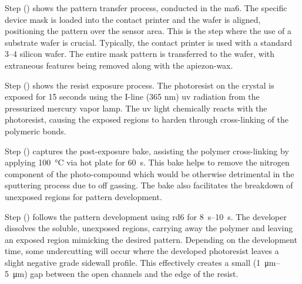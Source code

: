 \documentclass[../../main.tex]{subfiles}
\begin{document}
    Step () shows the pattern transfer process, conducted in the \gls{ma6}.
    The specific device mask is loaded into the contact printer and the wafer is aligned, positioning the pattern over the sensor area.
    This is the step where the use of a substrate wafer is crucial.
    Typically, the contact printer is used with a standard \SIrange{3}{4}{\inch} silicon wafer.
    The entire mask pattern is transferred to the wafer, with extraneous features being removed along with the \gls{apiezon-wax}.
    \par%
    Step () shows the resist exposure process.
    The photoresist on the crystal is exposed for 15 seconds using the I-line (365 nm) \gls{uv} radiation from the pressurized mercury vapor lamp. 
    The \gls{uv} light chemically reacts with the photoresist, causing the exposed regions to harden through cross-linking of the polymeric bonds.
    \par%
    Step () captures the post-exposure bake, assisting the polymer cross-linking by applying \SI{100}{\celsius} via hot plate for \SI{60}{\second}.
    This bake helps to remove the nitrogen component of the photo-compound which would be otherwise detrimental in the sputtering process due to off gassing.
    The bake also facilitates the breakdown of unexposed regions for pattern development.
    \par%
    Step () follows the pattern development using \gls{rd6} for \SIrange{8}{10}{\second}.
    The developer dissolves the soluble, unexposed regions, carrying away the polymer and leaving an exposed region mimicking the desired pattern.
    Depending on the development time, some undercutting will occur where the developed photoresist leaves a slight negative grade sidewall profile.
    This effectively creates a small (\SIrange{1}{5}{\micro\meter}) gap between the open channels and the edge of the resist.
\end{document}
